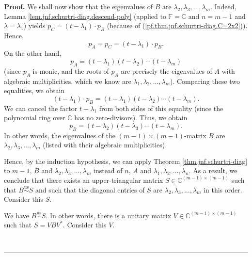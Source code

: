 \documentclass[numbers=enddot,12pt,final,onecolumn,notitlepage]{scrartcl}%
\numberwithin{exer}{subsection}
\theoremstyle{definition}
\newenvironment{proof}[1][Proof]{\noindent\textbf{#1.} }{\ \rule{0.5em}{0.5em}}
\begin{document}
\begin{proof}
We shall now show that the eigenvalues of $B$ are $\lambda_{2},\lambda
_{3},\ldots,\lambda_{m}$. Indeed, Lemma
\ref{lem.jnf.schurtri-diag.descend-poly} (applied to $\mathbb{F}=\mathbb{C}$
and $n=m-1$ and $\lambda=\lambda_{1}$) yields $p_{C}=\left(  t-\lambda
_{1}\right)  \cdot p_{B}$ (because of (\ref{pf.thm.jnf.schurtri-diag.C=2x2})).
Hence,%
\[
p_{A}=p_{C}=\left(  t-\lambda_{1}\right)  \cdot p_{B}.
\]
On the other hand,%
\[
p_{A}=\left(  t-\lambda_{1}\right)  \left(  t-\lambda_{2}\right)
\cdots\left(  t-\lambda_{m}\right)
\]
(since $p_{A}$ is monic, and the roots of $p_{A}$ are precisely the
eigenvalues of $A$ with algebraic multiplicities, which we know are
$\lambda_{1},\lambda_{2},\ldots,\lambda_{m}$). Comparing these two equalities,
we obtain%
\[
\left(  t-\lambda_{1}\right)  \cdot p_{B}=\left(  t-\lambda_{1}\right)
\left(  t-\lambda_{2}\right)  \cdots\left(  t-\lambda_{m}\right)  .
\]
We can cancel the factor $t-\lambda_{1}$ from both sides of this equality
(since the polynomial ring over $\mathbb{C}$ has no zero-divisors). Thus, we
obtain%
\[
p_{B}=\left(  t-\lambda_{2}\right)  \left(  t-\lambda_{3}\right)
\cdots\left(  t-\lambda_{m}\right)  .
\]
In other words, the eigenvalues of the $\left(  m-1\right)  \times\left(
m-1\right)  $-matrix $B$ are $\lambda_{2},\lambda_{3},\ldots,\lambda_{m}$
(listed with their algebraic multiplicities).

Hence, by the induction hypothesis, we can apply Theorem
\ref{thm.jnf.schurtri-diag} to $m-1$, $B$ and $\lambda_{2},\lambda_{3}%
,\ldots,\lambda_{m}$ instead of $n$, $A$ and $\lambda_{1},\lambda_{2}%
,\ldots,\lambda_{n}$. As a result, we conclude that there exists an
upper-triangular matrix $S\in\mathbb{C}^{\left(  m-1\right)  \times\left(
m-1\right)  }$ such that $B\overset{\operatorname*{us}}{\sim}S$ and such that
the diagonal entries of $S$ are $\lambda_{2},\lambda_{3},\ldots,\lambda_{m}$
in this order. Consider this $S$.

We have $B\overset{\operatorname*{us}}{\sim}S$. In other words, there is a
unitary matrix $V\in\mathbb{C}^{\left(  m-1\right)  \times\left(  m-1\right)
}$ such that $S=VBV^{\ast}$. Consider this $V$.


\end{proof}
\end{document}
